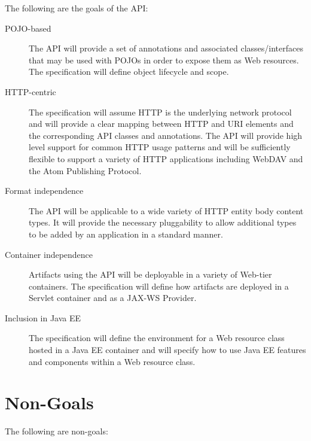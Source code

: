The following are the goals of the API:

\begin{description}

\item[POJO-based] The API will provide a set of annotations and associated classes/interfaces that may be used with POJOs in order to expose them as Web resources. The specification will define object lifecycle and scope.

\item[HTTP-centric] The specification will assume HTTP\cite{http11} is the underlying network protocol and will provide a clear mapping between HTTP and URI\cite{uri} elements and the corresponding API classes and annotations. The API will provide high level support for common HTTP usage patterns and will be sufficiently flexible to support a variety of HTTP applications including WebDAV\cite{webdav} and the Atom Publishing Protocol\cite{atompub}.

\item[Format independence] The API will be applicable to a wide variety of HTTP entity body content types. It will provide the necessary pluggability to allow additional types to be added by an application in a standard manner.

\item[Container independence] Artifacts using the API will be deployable in a variety of Web-tier containers. The specification will define how artifacts are deployed in a Servlet\cite{servlet} container and as a JAX-WS\cite{jsr224} Provider.

\item[Inclusion in Java EE] The specification will define the environment for a Web resource class hosted in a Java EE container and will specify how to use Java EE features and components within a Web resource class.

\end{description}

\section{Non-Goals}

The following are non-goals:

